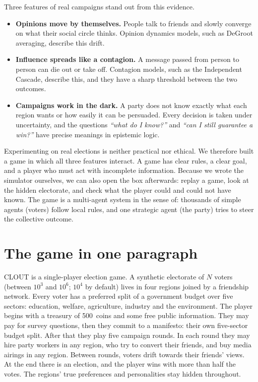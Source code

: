 \documentclass[11pt,a4paper,oneside]{report}
\newcommand{\coins}[1]{#1~coins}
\begin{document}
Three features of real campaigns stand out from this evidence.
\begin{itemize}
  \item \textbf{Opinions move by themselves.} People talk to friends and slowly converge on what their
        social circle thinks. Opinion dynamics models, such as DeGroot averaging,
        describe this drift.
  \item \textbf{Influence spreads like a contagion.} A message passed from person to person can die out or
        take off. Contagion models, such as the Independent Cascade,
        describe this, and they have a sharp threshold between the two outcomes.
  \item \textbf{Campaigns work in the dark.} A party does not know exactly what each region wants or how
        easily it can be persuaded. Every decision is taken under uncertainty, and the questions
        \emph{``what do I know?''} and \emph{``can I still guarantee a win?''} have precise meanings in
        epistemic logic.
\end{itemize}

Experimenting on real elections is neither practical nor ethical. We therefore built a game in which all
three features interact. A game has clear rules, a clear goal, and a player who must act with incomplete
information. Because we wrote the simulator ourselves, we can also open the box afterwards: replay a game,
look at the hidden electorate, and check what the player could and could not have known. The game is a
multi-agent system in the sense of: thousands of simple agents (voters)
follow local rules, and one strategic agent (the party) tries to steer the collective outcome.

\section{The game in one paragraph}

CLOUT is a single-player election game. A synthetic electorate of $N$ voters (between $10^3$ and $10^6$;
$10^4$ by default) lives in four regions joined by a friendship network. Every voter has a preferred split
of a government budget over five sectors: education, welfare, agriculture, industry and the environment.
The player begins with a treasury of \coins{500} and some free public information. They may pay for survey
questions, then they commit to a manifesto: their own five-sector budget split. After that they play five
campaign rounds. In each round they may hire party workers in any region, who try to convert their
friends, and buy media airings in any region. Between rounds, voters drift towards their friends' views.
At the end there is an election, and the player wins with more than half the votes. The regions' true
preferences and personalities stay hidden throughout.
\end{document}

